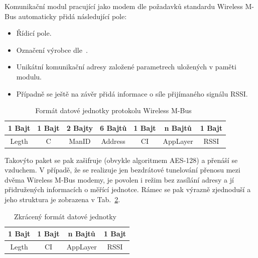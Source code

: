 Komunikační modul pracující jako modem dle požadavků standardu Wireless M-Bus automaticky přidá následující pole:

\begin{itemize}
	\item Řídicí pole.
\item Označení výrobce dle~\cite{WmbusVendors}.
\item Unikátní komunikační adresy založené parametrech uložených v paměti modulu.
\item Případně se ještě na závěr přidá informace o síle přijímaného signálu RSSI.
\end{itemize}



\begin{table}[!ht]
\centering
\begin{tabular}{ccccccc}
1 Bajt & 1 Bajt & 2 Bajty & 6 Bajtů & 1 Bajt & n Bajtů & 1 Bajt \\ \hline
\multicolumn{1}{|c|}{Legth} & \multicolumn{1}{c|}{C} & \multicolumn{1}{c|}{ManID} & \multicolumn{1}{c|}{Address} & \multicolumn{1}{c|}{CI} & \multicolumn{1}{c|}{AppLayer} & \multicolumn{1}{c|}{RSSI} \\ \hline
\end{tabular}
\caption{Formát datové jednotky protokolu Wireless M-Bus~\cite{FormatDatoveJednotky}}
\label{PaketWm2}
\vspace{-5pt}
\end{table}

Takovýto paket se pak zašifruje (obvykle algoritmem AES-128) a přenáší se vzduchem. V případě, že se realizuje jen bezdrátové tunelování přenosu mezi dvěma Wireless M-Bus modemy, je povolen i režim bez zasílání adresy a jí přidružených informacích o měřící jednotce. Rámec se pak výrazně zjednoduší a jeho struktura je zobrazena v Tab.~\ref{PaketWm3}.

			
			\begin{table}[!ht]
			\vspace{-10pt}
\centering
\begin{tabular}{cccc}
1 Bajt & 1 Bajt & n Bajtů & 1 Bajt \\ \hline
\multicolumn{1}{|c|}{Legth} & \multicolumn{1}{c|}{CI} & \multicolumn{1}{c|}{AppLayer} & \multicolumn{1}{c|}{RSSI} \\ \hline
\end{tabular}
\caption{Zkrácený formát datové jednotky~\cite{FormatDatoveJednotky}}
\label{PaketWm3}
\vspace{-20pt}
\end{table}
			
